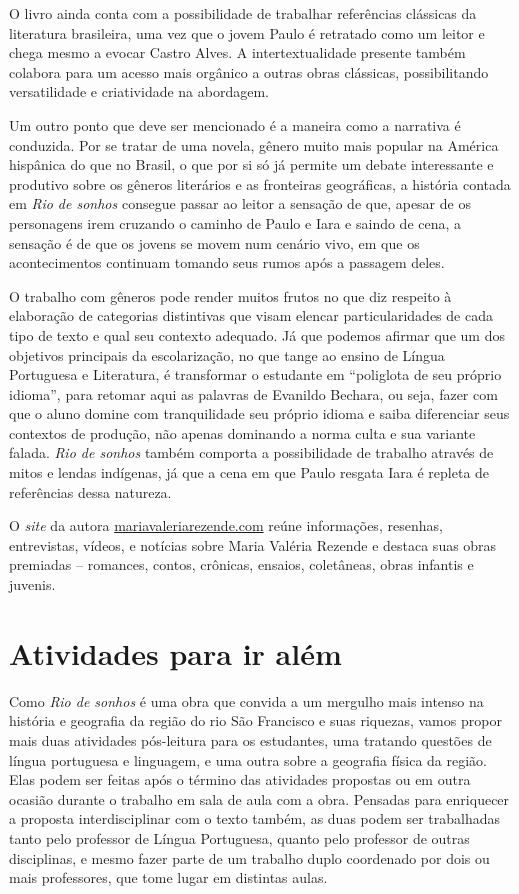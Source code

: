 \documentclass[12pt]{extarticle}
\begin{document}
  O livro ainda conta com a possibilidade de trabalhar referências
  clássicas da literatura brasileira, uma vez que o jovem Paulo é
  retratado como um leitor e chega mesmo a evocar Castro Alves. A
  intertextualidade presente também colabora para um acesso mais
  orgânico a outras obras clássicas, possibilitando versatilidade e
  criatividade na abordagem.

  Um outro ponto que deve ser mencionado é a maneira como a narrativa é
  conduzida. Por se tratar de uma novela, gênero muito mais popular na
  América hispânica do que no Brasil, o que por si só já permite um
  debate interessante e produtivo sobre os gêneros literários e as
  fronteiras geográficas, a história contada em \emph{Rio de sonhos}
  consegue passar ao leitor a sensação de que, apesar de os personagens
  irem cruzando o caminho de Paulo e Iara e saindo de cena, a sensação é
  de que os jovens se movem num cenário vivo, em que os acontecimentos
  continuam tomando seus rumos após a passagem deles.

  O trabalho com gêneros pode render muitos frutos no que diz respeito à
  elaboração de categorias distintivas que visam elencar
  particularidades de cada tipo de texto e qual seu contexto adequado.
  Já que podemos afirmar que um dos objetivos principais da
  escolarização, no que tange ao ensino de Língua Portuguesa e
  Literatura, é transformar o estudante em ``poliglota de seu próprio
  idioma'', para retomar aqui as palavras de Evanildo Bechara, ou seja,
  fazer com que o aluno domine com tranquilidade seu próprio idioma e
  saiba diferenciar seus contextos de produção, não apenas dominando a
  norma culta e sua variante falada. \emph{Rio de sonhos} também
  comporta a possibilidade de trabalho através de mitos e lendas
  indígenas, já que a cena em que Paulo resgata Iara é repleta de
  referências dessa natureza.

  O \emph{site} da autora
  \href{https://www.mariavaleriarezende.com/}{mariavaleriarezende.com}
  reúne informações, resenhas, entrevistas, vídeos, e notícias sobre
  Maria Valéria Rezende e destaca suas obras premiadas -- romances,
  contos, crônicas, ensaios, coletâneas, obras infantis e juvenis.

  \section{Atividades para ir além}

  Como \emph{Rio de sonhos} é uma obra que convida a um mergulho mais
  intenso na história e geografia da região do rio São Francisco e suas
  riquezas, vamos propor mais duas atividades pós-leitura para os
  estudantes, uma tratando questões de língua portuguesa e linguagem, e
  uma outra sobre a geografia física da região. Elas podem ser feitas
  após o término das atividades propostas ou em outra ocasião durante o
  trabalho em sala de aula com a obra. Pensadas para enriquecer a
  proposta interdisciplinar com o texto também, as duas podem ser
  trabalhadas tanto pelo professor de Língua Portuguesa, quanto pelo
  professor de outras disciplinas, e mesmo fazer parte de um trabalho
  duplo coordenado por dois ou mais professores, que tome lugar em
  distintas aulas.
\end{document}
